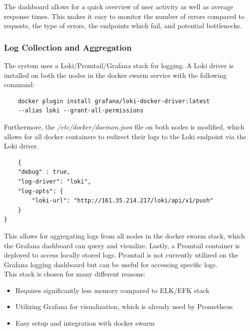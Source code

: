 The dashboard allows for a quick overview of user activity as well as average response times.
This makes it easy to monitor the number of errors compared to requests, the type of errors, the endpoints which fail, and potential bottlenecks.




\subsubsection{Log Collection and Aggregation}
The system uses a Loki/Promtail/Grafana stack for logging. A Loki driver is installed on both the nodes in the docker swarm service with the following command:

\begin{verbatim}
    docker plugin install grafana/loki-docker-driver:latest
    --alias loki --grant-all-permissions
\end{verbatim}

Furthermore, the \textit{/etc/docker/daemon.json} file on both nodes is modified, which allows for all docker containers to redirect their logs to the Loki endpoint via the Loki driver.

\begin{verbatim}
    {
    "debug" : true,
    "log-driver": "loki",
    "log-opts": {
        "loki-url": "http://161.35.214.217/loki/api/v1/push"
    }
}
\end{verbatim}

This allows for aggregating logs from all nodes in the docker swarm stack, which the Grafana dashboard can query and visualize. Lastly, a Promtail container is deployed to access locally stored logs. Promtail is not currently utilized on the Grafana logging dashboard but can be useful for accessing specific logs.\\

\noindent
This stack is chosen for many different reasons:
\begin{itemize}
    \item Requires significantly less memory compared to ELK/EFK stack
    \item Utilizing Grafana for visualization, which is already used by Prometheus
    \item Easy setup and integration with docker swarm
\end{itemize}

